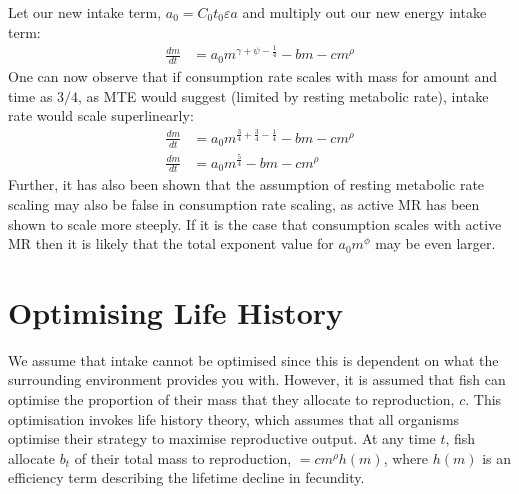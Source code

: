 \documentclass[a4paper]{article} %
\begin{document}
Let our new intake term, $a_0 = C_{0}t_{0}\varepsilon a$ and multiply out our new energy intake term:
\begin{align}
    \frac{dm}{dt} &= a_{0}m^{\gamma + \psi -\frac{1}{4}} - bm - cm^{\rho}
\end{align}
One can now observe that if consumption rate scales with mass for amount and time as $3/4$, as MTE would suggest (limited by resting metabolic rate), intake rate would scale superlinearly:
\begin{align}
    \frac{dm}{dt} &= a_{0}m^{\frac{3}{4} + \frac{3}{4} -\frac{1}{4}} - bm - cm^{\rho} \\
    \frac{dm}{dt} &= a_{0}m^{\frac{5}{4}} - bm - cm^{\rho}
\end{align}
Further, it has also been shown that the assumption of resting metabolic rate scaling may also be false in consumption rate scaling, as active MR has been shown to scale more steeply. If it is the case that consumption scales with active MR then it is likely that the total exponent value for $a_{0}m^\phi$ may be even larger.

\section{Optimising Life History}
We assume that intake cannot be optimised since this is dependent on what the surrounding environment provides you with. However, it is assumed that fish can optimise the proportion of their mass that they allocate to reproduction, $c$. This optimisation invokes life history theory, which assumes that all organisms optimise their strategy to maximise reproductive output. At any time $t$, fish allocate $b_{t}$ of their total mass to reproduction, $= cm^{\rho}h(m)$, where $h(m)$ is an efficiency term describing the lifetime decline in fecundity. 
\end{document}
